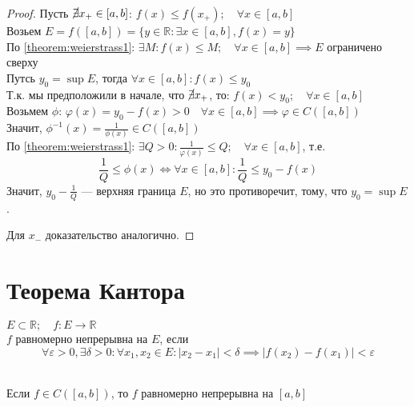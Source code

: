 \begin{proof}
	Пусть  $\cancel{\exists} x_{+} \in [a,b]$: $f(x)\le f(x_{+}); \quad \forall x \in [a,b]$\\
	Возьем $E = f([a,b])=\{y \in \mathbb{R}: \exists x \in [a,b], f(x)=y\}$ \\
	По \ref{theorem:weierstrass1}: $\exists M: f(x)\le M; \quad \forall x \in [a,b] \implies E$ ограничено сверху\\
	Путсь $y_0=\sup E$, тогда $\forall x \in [a, b]: f(x) \leq y_0$\\
	Т.к. мы предположили в начале, что $\cancel{\exists} x_{+}$, то: $f(x)<y_0; \quad \forall x \in [a,b]$\\
	Возьмем $\phi$: $\varphi(x)=y_0-f(x) > 0 \quad \forall x \in [a,b] \implies \varphi \in C([a,b])$\\
	Значит, $\phi^{-1}(x) = \frac{1}{\phi(x)} \in C([a,b])$\\
	По \ref{theorem:weierstrass1}: $\exists Q > 0: \displaystyle\frac{1}{\varphi(x)}\le Q; \quad \forall x \in [a,b]$, т.е.\\
	\[\frac{1}{Q} \leq \phi(x) \iff \forall x \in [a, b]: \frac{1}{Q} \leq y_0 - f(x)\]
	Значит, $y_0 - \frac{1}{Q}$ --- верхняя граница $E$, но это противоречит, тому, что $y_0 = \sup E$.

	Для $x_-$ доказательство аналогично.
\end{proof}


\section{Теорема Кантора}
\begin{definition}
	$E \subset \mathbb{R}; \quad  f: E \to \mathbb{R}$\\
	$f$ равномерно непрерывна на  $E$, если\\
	$$\forall \varepsilon >0, \exists \delta >0: \forall x_1,x_2 \in E: |x_2-x_1|<\delta \implies |f(x_2)-f(x_1)|<\varepsilon$$\\
\end{definition}

\begin{theorem}
	Если $f \in C([a,b])$, то $f$ равномерно непрерывна на $[a,b]$
\end{theorem}


